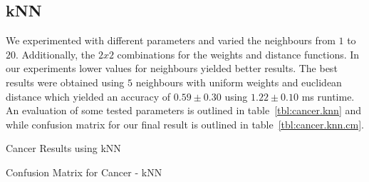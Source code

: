 \subsection{kNN}
We experimented with different parameters and varied the neighbours from $1$ to $20$. 
Additionally, the $2x2$ combinations for the weights and distance functions. 
In our experiments lower values for neighbours yielded better results. 
The best results were obtained using $5$ neighbours with uniform weights and euclidean distance which yielded an accuracy of $0.59 \pm 0.30$ using $1.22 \pm 0.10$ ms runtime. 
An evaluation of some tested parameters is outlined in table~\ref{tbl:cancer.knn} and while confusion matrix for our final result is outlined in table~\ref{tbl:cancer.knn.cm}.

\begin{table}[htb]
\centering

\caption{Cancer Results using kNN}
\label{tbl:cancer.knn}
\end{table}

\begin{table}[hbt]
\centering

\caption{Confusion Matrix for Cancer - kNN}
\label{tbl:cancer.knn.cm}
\end{table}
